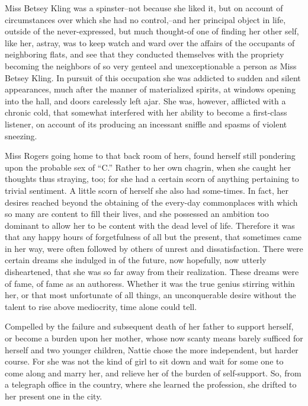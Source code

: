 Miss Betsey Kling was a spinster--not because she liked it, but on
account of circumstances over which she had no control,--and her
principal object in life, outside of the never-expressed, but much
thought-of one of finding her other self, like her, astray, was to keep
watch and ward over the affairs of the occupants of neighboring flats,
and see that they conducted themselves with the propriety becoming the
neighbors of so very genteel and unexceptionable a person as Miss Betsey
Kling. In pursuit of this occupation she was addicted to sudden and
silent appearances, much after the manner of materialized spirits, at
windows opening into the hall, and doors carelessly left ajar. She was,
however, afflicted with a chronic cold, that somewhat interfered with
her ability to become a first-class listener, on account of its
producing an incessant sniffle and spasms of violent sneezing.

Miss Rogers going home to that back room of hers, found herself still
pondering upon the probable sex of ``C.'' Rather to her own chagrin, when
she caught her thoughts thus straying, too; for she had a certain scorn
of anything pertaining to trivial sentiment. A little scorn of herself
she also had some-times. In fact, her desires reached beyond the
obtaining of the every-day commonplaces with which so many are content
to fill their lives, and she possessed an ambition too dominant to allow
her to be content with the dead level of life. Therefore it was that any
happy hours of forgetfulness of all but the present, that sometimes came
in her way, were often followed by others of unrest and dissatisfaction.
There were certain dreams she indulged in of the future, now hopefully,
now utterly disheartened, that she was so far away from their
realization. These dreams were of fame, of fame as an authoress. Whether
it was the true genius stirring within her, or that most unfortunate of
all things, an unconquerable desire without the talent to rise above
mediocrity, time alone could tell.

Compelled by the failure and subsequent death of her father to support
herself, or become a burden upon her mother, whose now scanty means
barely sufficed for herself and two younger children, Nattie chose the
more independent, but harder course. For she was not the kind of girl to
sit down and wait for some one to come along and marry her, and relieve
her of the burden of self-support. So, from a telegraph office in the
country, where she learned the profession, she drifted to her present
one in the city.

